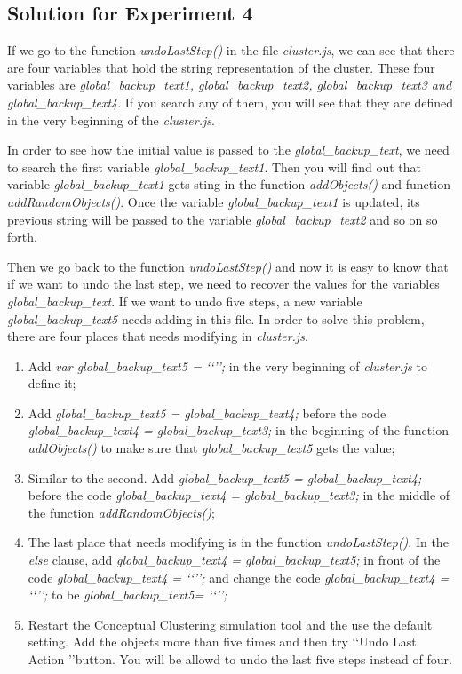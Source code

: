 \subsection {Solution for Experiment 4}
If we go to the function \emph{undoLastStep()} in the file \emph{cluster.js}, we can see that there are four variables that hold the string representation of the cluster. These four variables are \emph{global\_backup\_text1, global\_backup\_text2, global\_backup\_text3 and global\_backup\_text4}. If you search any of them, you will see that they are defined in the very beginning of the \emph{cluster.js}. 

In order to see how the initial value is passed to the \emph{global\_backup\_text}, we need to search the first variable \emph{global\_backup\_text1}. Then you will find out that variable \emph{global\_backup\_text1} gets sting in the function \emph{addObjects()} and function \emph{addRandomObjects()}. Once the variable \emph{global\_backup\_text1} is updated, its previous string will be passed to the variable \emph{global\_backup\_text2} and so on so forth.

Then we go back to the function \emph{undoLastStep()} and now it is easy to know that if we want to undo the last step, we need to recover the values for the variables \emph{global\_backup\_text}. If we want to undo five steps, a new variable \emph{global\_backup\_text5} needs adding in this file. In order to solve this problem, there are four places that needs modifying in \emph{cluster.js}.
\begin{enumerate}[1)]
\item Add \emph{var global\_backup\_text5 = \lq\lq \rq\rq;} in the very beginning of \emph{cluster.js} to define it;
\item Add \emph{global\_backup\_text5 = global\_backup\_text4;} before the code \emph{global\_backup\_text4 = global\_backup\_text3;} in the beginning of the function \emph{addObjects()} to make sure that \emph{global\_backup\_text5} gets the value; 
\item Similar to the second. Add \emph{global\_backup\_text5 = global\_backup\_text4;} before the code \emph{global\_backup\_text4 = global\_backup\_text3;} in the middle of the function \emph{addRandomObjects()};
\item The last place that needs modifying is in the function \emph{undoLastStep()}. In the \emph{else} clause, add \emph{global\_backup\_text4 = global\_backup\_text5;} in front of the code \emph{global\_backup\_text4 = \lq\lq \rq\rq;} and change the code \emph{global\_backup\_text4 = \lq\lq \rq\rq;} to be \emph{global\_backup\_text5= \lq\lq \rq\rq;}
\item Restart the Conceptual Clustering simulation tool and the use the default setting. Add the objects more than five times and then try \lq\lq Undo Last Action \rq\rq button. You will be allowd to undo the last five steps instead of four.
\end{enumerate}